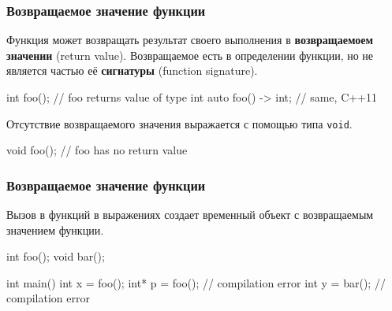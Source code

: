 \documentclass[compress, 8pt]{beamer}
\begin{document}
\begin{frame}[fragile]

    \frametitle{Возвращаемое значение функции}

    Функция может возвращать результат своего выполнения в \textbf{возвращаемоем значении}
    (return value).
    Возвращаемое есть в определении функции, но не является частью её \textbf{сигнатуры}
    (function signature\footnotemark{}).


    \begin{myinplacelisting}[minted language=cpp]
int foo(); // foo returns value of type int
auto foo() -> int; // same, C++11
    \end{myinplacelisting}

    Отсутствие возвращаемого значения выражается с помощью типа \verb|void|.

    \begin{myinplacelisting}[minted language=cpp]
void foo(); // foo has no return value
    \end{myinplacelisting}

\end{frame}

\begin{frame}[fragile]

    \frametitle{Возвращаемое значение функции}

    Вызов в функций в выражениях создает временный объект с возвращаемым
    значением функции.

    \begin{myinplacelisting}[minted language=cpp]
int foo();
void bar();

int main() {
    int x = foo();
    int* p = foo(); // compilation error
    int y = bar(); // compilation error
}
    \end{myinplacelisting}

\end{frame}
\end{document}
